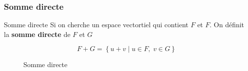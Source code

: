 \documentclass[dvipsnames]{beamer}
\begin{document}
\begin{frame}[t]
  \frametitle{Somme directe}

  \begin{block}{Somme directe}
    \small
    Si on cherche un espace vectortiel qui contient $F$ et $F$. On définit
    la \textbf{\alert{somme directe}} de $F$ et $G$

    \begin{equation}
      F+G = \left\{u+v\;|\; u\in F,\; v\in G\right\}
    \end{equation}
  \end{block}
  \begin{figure}[htpb]
  \begin{center}
  \end{center}
  \caption{Somme directe }%
  \label{fig:}
  \end{figure}
\end{frame}
\end{document}
